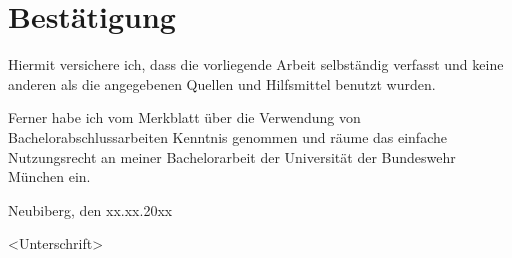\chapter*{Best\"atigung}

Hiermit versichere ich, dass die vorliegende Arbeit selbst\"andig verfasst und keine anderen als die angegebenen Quellen und Hilfsmittel benutzt wurden.

Ferner habe ich vom Merkblatt \"uber die Verwendung von Bachelorabschlussarbeiten Kenntnis genommen und r\"aume das einfache Nutzungsrecht an meiner Bachelorarbeit der Universit\"at der Bundeswehr M\"unchen ein.

\vspace{1cm}

Neubiberg, den xx.xx.20xx

\vspace{1cm} 

<Unterschrift>
